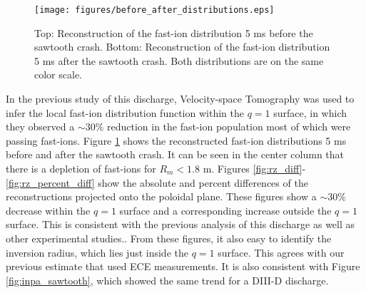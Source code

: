 \begin{figure}[h!]
    \centering
    \texttt{[image: figures/before\_after\_distributions.eps]}
    \caption{Top: Reconstruction of the fast-ion distribution 5 ms before the sawtooth crash. Bottom: Reconstruction of the fast-ion distribution 5 ms after the sawtooth crash. Both distributions are on the same color scale.}
    \label{fig:before_after}
\end{figure}
In the previous study of this discharge\cite{salewski2016high}, Velocity-space Tomography was used to infer the local fast-ion distribution function within the $q=1$ surface, in which they observed a $\sim$30\% reduction in the fast-ion population most of which were passing fast-ions. Figure \ref{fig:before_after} shows the reconstructed fast-ion distributions 5 ms before and after the sawtooth crash. It can be seen in the center column that there is a depletion of fast-ions for $R_m < 1.8$ m. Figures \ref{fig:rz_diff}-\ref{fig:rz_percent_diff} show the absolute and percent differences of the reconstructions projected onto the poloidal plane. These figures show a $\sim30$\% decrease within the $q=1$ surface and a corresponding increase outside the $q=1$ surface. This is consistent with the previous analysis of this discharge as well as other experimental studies.\cite{weiland2016,du2018inpa,salewski2016high}. From these figures, it also easy to identify the inversion radius, which lies just inside the $q=1$ surface. This agrees with our previous estimate that used ECE measurements. It is also consistent with Figure \ref{fig:inpa_sawtooth}, which showed the same trend for a DIII-D discharge.
